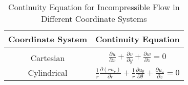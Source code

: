 \begin{table}[h]
    \centering
    \caption{Continuity Equation for Incompressible Flow in Different Coordinate Systems}
    \begin{tabular}{cc}
        \toprule
        Coordinate System & Continuity Equation \\
        \hline \\[-1ex]
        Cartesian & \(\displaystyle \frac{\partial u}{\partial x} + \frac{\partial v}{\partial y} + \frac{\partial w}{\partial z} = 0\) \\[3ex]
        Cylindrical & \(\displaystyle \frac{1}{r} \frac{\partial (r u_r)}{\partial r} + \frac{1}{r} \frac{\partial u_{\theta}}{\partial \theta} + \frac{\partial u_z}{\partial z} = 0\) \\[3ex]
        \bottomrule
    \end{tabular}
\end{table}


